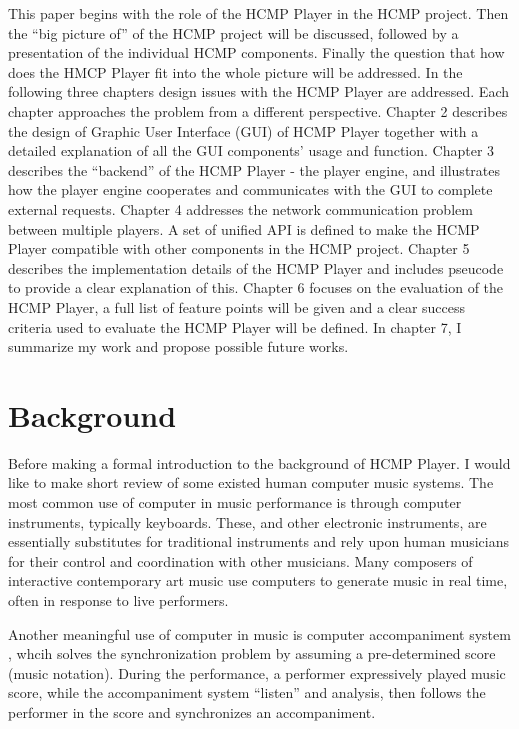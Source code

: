 This paper begins with the role of the HCMP Player in the HCMP project. Then
the ``big picture of'' of the HCMP project will be discussed, followed by a
presentation of the individual HCMP components. Finally the question that how
does the HMCP Player fit into the whole picture will be addressed. In the
following three chapters design issues with the HCMP Player are addressed.
Each chapter approaches the problem from a different perspective. Chapter 2
describes the design of Graphic User Interface (GUI) of HCMP Player together
with a detailed explanation of all the GUI components' usage and function.
Chapter 3 describes the ``backend'' of the HCMP Player - the player engine,
and illustrates how the player engine cooperates and communicates with the
GUI to complete external requests. Chapter 4 addresses the network
communication problem between multiple players. A set of unified API is
defined to make the HCMP Player compatible with other components in the HCMP
project.  Chapter 5 describes the implementation details of the HCMP Player
and includes pseucode to provide a clear explanation of this. Chapter 6
focuses on the evaluation of the HCMP Player, a full list of feature points
will be given and a clear success criteria used to evaluate the HCMP Player
will be defined.  In chapter 7, I summarize my work and propose possible
future works.

\section{Background}

Before making a formal introduction to the background of HCMP Player. 
I would like to make short review of  
some existed human computer music systems. The most common use of computer in
music performance is through computer instruments, typically keyboards.
These, and other electronic instruments, are essentially substitutes for traditional
instruments and rely upon human musicians for their control and coordination with
other musicians. Many composers of interactive contemporary art music use computers
to generate music in real time, often in response to live performers.

Another meaningful use of computer in music is computer accompaniment system 
\cite{Roger:89}, 
whcih solves the synchronization problem by assuming a pre-determined 
score (music notation). During the performance, a performer expressively 
played music score, while the accompaniment system ``listen'' and analysis, 
then follows the performer 
in the score and synchronizes an accompaniment.

